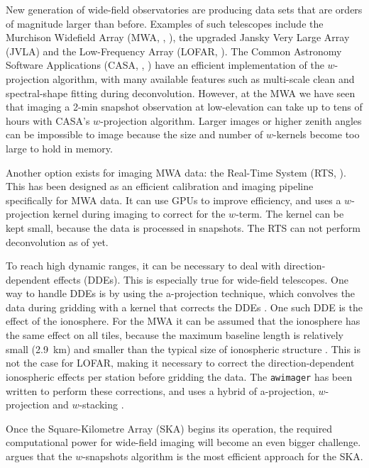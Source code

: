 \documentclass[useAMS,usenatbib]{mn2e}
\begin{document}
New generation of wide-field observatories are producing data sets that are orders of magnitude larger than before. Examples of such telescopes include the Murchison Widefield Array (MWA, \citealt{mwa-design-2009}, \citealt{mwa}), the upgraded Jansky Very Large Array (JVLA) and the Low-Frequency Array (LOFAR, \citealt{lofar-2013}). The Common Astronomy Software Applications (CASA, \citealt{casa-2007}, \citealt{casa-2008}) have an efficient implementation of the $w$-projection algorithm, with many available features such as multi-scale clean and spectral-shape fitting during deconvolution. However, at the MWA we have seen that imaging a 2-min snapshot observation at low-elevation can take up to tens of hours with CASA's $w$-projection algorithm. Larger images or higher zenith angles can be impossible to image because the size and number of $w$-kernels become too large to hold in memory.

Another option exists for imaging MWA data: the Real-Time System (RTS, \citealt{rts-mwa}). This has been designed as an efficient calibration and imaging pipeline specifically for MWA data. It can use GPUs to improve efficiency, and uses a $w$-projection kernel during imaging to correct for the $w$-term. The kernel can be kept small, because the data is processed in snapshots. The RTS can not perform deconvolution as of yet.

To reach high dynamic ranges, it can be necessary to deal with direction-dependent effects (DDEs). This is especially true for wide-field telescopes. One way to handle DDEs is by using the a-projection technique, which convolves the data during gridding with a kernel that corrects the DDEs \citep{aprojection-2008}.
One such DDE is the effect of the ionosphere. For the MWA it can be assumed that the ionosphere has the same effect on all tiles, because the maximum baseline length is relatively small (2.9~km) and smaller than the typical size of ionospheric structure \citep{lonsdale-calibration-approaches-ionosphere}. This is not the case for LOFAR, making it necessary to correct the direction-dependent ionospheric effects per station before gridding the data. The \texttt{awimager} has been written to perform these corrections, and uses a hybrid of a-projection, $w$-projection and $w$-stacking \citep{awimager-2013}.

Once the Square-Kilometre Array (SKA) begins its operation, the required computational power for wide-field imaging will become an even bigger challenge. \citet{widefield-imaging-ska-cornwell} argues that the $w$-snapshots algorithm is the most efficient approach for the SKA.
\end{document}
